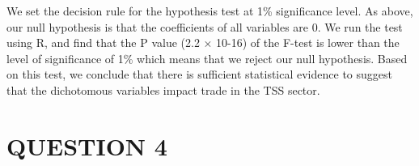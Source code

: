 \documentclass[
]{article}
\newenvironment{Shaded}{\begin{snugshade}}{\end{snugshade}}
\newcommand{\AttributeTok}[1]{\textcolor[rgb]{0.77,0.63,0.00}{#1}}
\newcommand{\CommentTok}[1]{\textcolor[rgb]{0.56,0.35,0.01}{\textit{#1}}}
\newcommand{\DecValTok}[1]{\textcolor[rgb]{0.00,0.00,0.81}{#1}}
\newcommand{\FunctionTok}[1]{\textcolor[rgb]{0.00,0.00,0.00}{#1}}
\newcommand{\NormalTok}[1]{#1}
\newcommand{\OtherTok}[1]{\textcolor[rgb]{0.56,0.35,0.01}{#1}}
\newcommand{\SpecialCharTok}[1]{\textcolor[rgb]{0.00,0.00,0.00}{#1}}
\newcommand{\StringTok}[1]{\textcolor[rgb]{0.31,0.60,0.02}{#1}}
\begin{document}
We set the decision rule for the hypothesis test at 1\% significance
level. As above, our null hypothesis is that the coefficients of all
variables are 0. We run the test using R, and find that the P value (2.2
× 10-16) of the F-test is lower than the level of significance of 1\%
which means that we reject our null hypothesis. Based on this test, we
conclude that there is sufficient statistical evidence to suggest that
the dichotomous variables impact trade in the TSS sector.

\hypertarget{question-4}{%
\section{QUESTION 4}\label{question-4}}

\begin{Shaded}
\end{Shaded}
\end{document}
